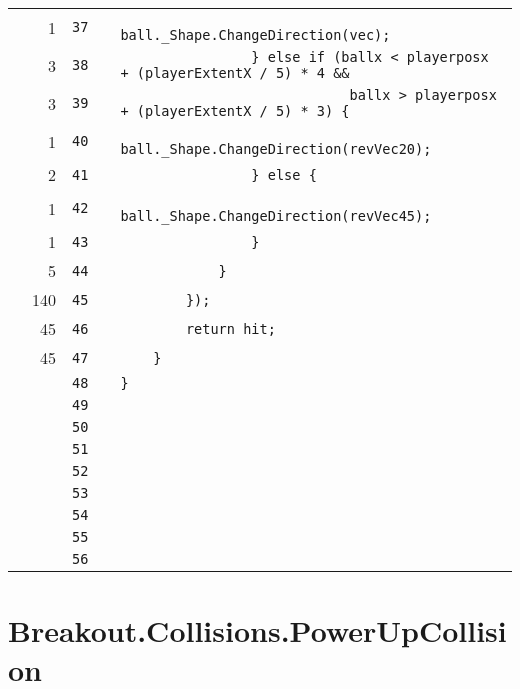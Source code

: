 \documentclass[a4paper,landscape,10pt]{article}
\begin{document}
\begin{longtable}[l]{lrrll}
\cellcolor{green} & 1 & \verb~37~ & & \verb~                    ball._Shape.ChangeDirection(vec);~\\
\cellcolor{green} & 3 & \verb~38~ & & \verb~                } else if (ballx < playerposx + (playerExtentX / 5) * 4 &&~\\
\cellcolor{green} & 3 & \verb~39~ & & \verb~                            ballx > playerposx + (playerExtentX / 5) * 3) {~\\
\cellcolor{green} & 1 & \verb~40~ & & \verb~                    ball._Shape.ChangeDirection(revVec20);~\\
\cellcolor{green} & 2 & \verb~41~ & & \verb~                } else {~\\
\cellcolor{green} & 1 & \verb~42~ & & \verb~                    ball._Shape.ChangeDirection(revVec45);~\\
\cellcolor{green} & 1 & \verb~43~ & & \verb~                }~\\
\cellcolor{green} & 5 & \verb~44~ & & \verb~            }~\\
\cellcolor{green} & 140 & \verb~45~ & & \verb~        });~\\
\cellcolor{green} & 45 & \verb~46~ & & \verb~        return hit;~\\
\cellcolor{green} & 45 & \verb~47~ & & \verb~    }~\\
\cellcolor{gray} &  & \verb~48~ & & \verb~}~\\
\cellcolor{gray} &  & \verb~49~ & & \verb~~\\
\cellcolor{gray} &  & \verb~50~ & & \verb~~\\
\cellcolor{gray} &  & \verb~51~ & & \verb~~\\
\cellcolor{gray} &  & \verb~52~ & & \verb~~\\
\cellcolor{gray} &  & \verb~53~ & & \verb~~\\
\cellcolor{gray} &  & \verb~54~ & & \verb~~\\
\cellcolor{gray} &  & \verb~55~ & & \verb~~\\
\cellcolor{gray} &  & \verb~56~ & & \verb~~\\
\end{longtable}
\newpage
\section{Breakout.Collisions.PowerUpCollision}
\end{document}
